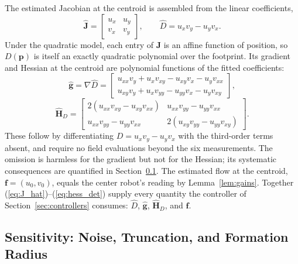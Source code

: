 \documentclass[lettersize,journal]{IEEEtran}
\begin{document}
The estimated Jacobian at the centroid is assembled from the linear
coefficients,
\begin{equation}
    \hat{\mathbf{J}} =
    \begin{bmatrix} u_x & u_y \\ v_x & v_y \end{bmatrix},
    \qquad
    \hat{D} = u_x v_y - u_y v_x.
    \label{eq:J_hat}
\end{equation}
Under the quadratic model, each entry of $\mathbf{J}$ is an affine
function of position, so $D(\mathbf{p})$ is itself an exactly quadratic
polynomial over the footprint. Its gradient and Hessian at the centroid
are polynomial functions of the fitted coefficients:
\begin{equation}
    \hat{\mathbf{g}} = \nabla \hat{D} =
    \begin{bmatrix}
        u_{xx} v_y + u_x v_{xy} - u_{xy} v_x - u_y v_{xx} \\
        u_{xy} v_y + u_x v_{yy} - u_{yy} v_x - u_y v_{xy}
    \end{bmatrix},
    \label{eq:grad_det}
\end{equation}
\begin{equation}
    \hat{\mathbf{H}}_D =
    \begin{bmatrix}
        2(u_{xx} v_{xy} - u_{xy} v_{xx}) &
        u_{xx} v_{yy} - u_{yy} v_{xx} \\
        u_{xx} v_{yy} - u_{yy} v_{xx} &
        2(u_{xy} v_{yy} - u_{yy} v_{xy})
    \end{bmatrix}.
    \label{eq:hess_det}
\end{equation}
These follow by differentiating $D = u_x v_y - u_y v_x$ with the
third-order terms absent, and require no field evaluations beyond the six
measurements. The omission is harmless for the gradient but not for the
Hessian; its systematic consequences are quantified in
Section~\ref{sec:sensitivity}. The estimated flow at the centroid,
$\mathbf{f} = (u_0, v_0)$, equals the center robot's reading by
Lemma~\ref{lem:gains}. Together
(\ref{eq:J_hat})--(\ref{eq:hess_det}) supply every quantity the
controller of Section~\ref{sec:controllers} consumes: $\hat{D}$,
$\hat{\mathbf{g}}$, $\hat{\mathbf{H}}_D$, and $\mathbf{f}$.

\subsection{Sensitivity: Noise, Truncation, and Formation Radius}
\label{sec:sensitivity}
\end{document}
